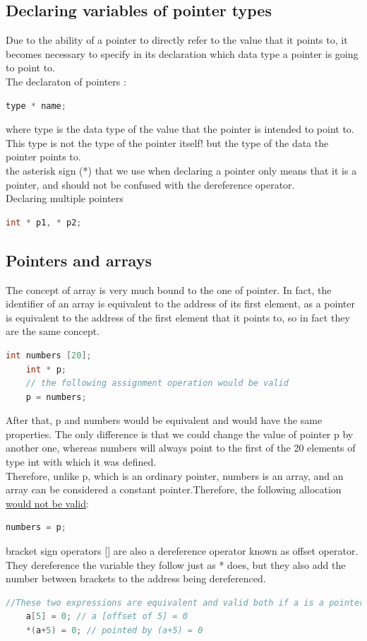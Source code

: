 \documentclass[12pt,oneside]{book}
\begin{document}
\subsection{Declaring variables of pointer types}
Due to the ability of a pointer to directly refer to the value that it points to, it becomes necessary to specify in its declaration which data type a pointer is going to point to.\\
The declaraton of pointers :
\begin{lstlisting}[language=C++]
    type * name;
\end{lstlisting}
where type is the data type of the value that the pointer is intended to point to. This type is not the type of the pointer itself! but the type of the data the pointer points to.\\
the asterisk sign (*) that we use when declaring a pointer only means that it is a pointer, and should not be confused with the dereference operator.\\
Declaring multiple pointers
	\begin{lstlisting}[language=C++]
    int * p1, * p2;
\end{lstlisting}
\subsection{Pointers and arrays}
The concept of array is very much bound to the one of pointer. In fact, the identifier of an array is equivalent to the address of its first element, as a pointer is equivalent to the address of the first element that it points to, so in fact they are the same concept.
	\begin{lstlisting}[language=C++]
    int numbers [20];
    int * p; 
    // the following assignment operation would be valid
    p = numbers;
\end{lstlisting}
After that, p and numbers would be equivalent and would have the same properties. The only difference is that we could change the value of pointer p by another one, whereas numbers will always point to the first of the 20 elements of type int with which it was defined. \\
Therefore, unlike p, which is an ordinary pointer, numbers is an array, and an array can be considered a constant pointer.Therefore, the following allocation \underline{would not be valid}:
\begin{lstlisting}[language=C++]
    numbers = p;
\end{lstlisting}
bracket sign operators [] are also a dereference operator known as offset operator. They dereference the variable they follow just as * does, but they also add the number between brackets to the address being dereferenced.
	\begin{lstlisting}[language=C++]
    //These two expressions are equivalent and valid both if a is a pointer or if a is an array.
    a[5] = 0; // a [offset of 5] = 0
    *(a+5) = 0; // pointed by (a+5) = 0
\end{lstlisting}
\end{document}
